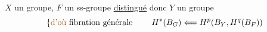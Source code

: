 $X$ un groupe, $F$ un ss-groupe \uline{distingué} donc $Y$ un groupe
\[
\left\{\unsure{\text{d'où}}\ \text{fibration générale}\right.
\qquad
H^*(B_G)\Longleftarrow H^p(B_Y,H^q(B_F))
\]

